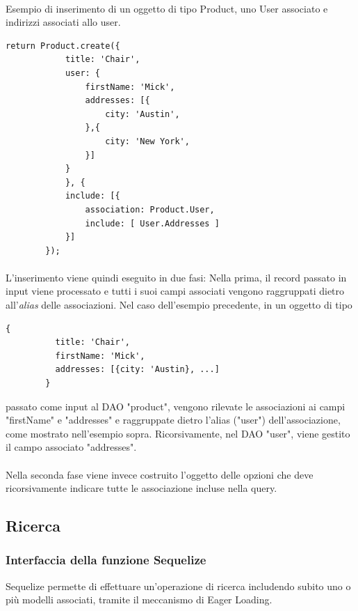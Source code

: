 \documentclass[a4paper, 12pt]{report}
\begin{document}
      \paragraph*{}
      Esempio di inserimento di un oggetto di tipo Product, uno User associato e indirizzi associati allo user.
      \begin{Verbatim}[samepage=true]
        return Product.create({
            title: 'Chair',
            user: {
                firstName: 'Mick',
                addresses: [{
                    city: 'Austin',
                },{
                    city: 'New York',
                }]
            }
            }, {
            include: [{
                association: Product.User,
                include: [ User.Addresses ]
            }]
        });
      \end{Verbatim}
      \paragraph*{}
      L'inserimento viene quindi eseguito in due fasi:
      Nella prima, il record passato in input viene processato e tutti i suoi campi associati vengono raggruppati dietro all'\emph{alias} delle associazioni.
      Nel caso dell'esempio precedente, in un oggetto di tipo
      \begin{Verbatim}[samepage=true]
        {
          title: 'Chair', 
          firstName: 'Mick',
          addresses: [{city: 'Austin}, ...]
        }
      \end{Verbatim}
      passato come input al DAO "product", vengono rilevate le associazioni ai campi "firstName" e "addresses" e raggruppate dietro l'alias ("user") dell'associazione, come mostrato nell'esempio sopra.
      Ricorsivamente, nel DAO "user", viene gestito il campo associato "addresses".
      \paragraph*{}
      Nella seconda fase viene invece costruito l'oggetto delle opzioni che deve ricorsivamente indicare tutte le associazione incluse nella query.
    \subsection{Ricerca}
      \subsubsection*{Interfaccia della funzione Sequelize}
        Sequelize permette di effettuare un'operazione di ricerca includendo subito uno o più modelli associati, tramite il meccanismo di Eager Loading.
\end{document}
